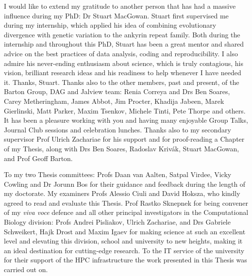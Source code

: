 I would like to extend my gratitude to another person that has had a massive influence during my PhD: Dr Stuart MacGowan. Stuart first supervised me during my internship, which applied his idea of combining evolutionary divergence with genetic variation to the ankyrin repeat family. Both during the internship and throughout this PhD, Stuart has been a great mentor and shared advice on the best practices of data analysis, coding and reproducibility. I also admire his never-ending enthusiasm about science, which is truly contagious, his vision, brilliant research ideas and his readiness to help whenever I have needed it. Thanks, Stuart. Thanks also to the other members, past and present, of the Barton Group, DAG and Jalview team: Renia Correya and Drs Ben Soares, Carey Metheringham, James Abbot, Jim Procter, Khadija Jabeen, Marek Gierlinski, Matt Parker, Maxim Tsenkov, Michele Tinti, Pete Thorpe and others. It has been a pleasure working with you and having many enjoyable Group Talks, Journal Club sessions and celebration lunches. Thanks also to my secondary supervisor Prof Ulrich Zachariae for his support and for proof-reading a Chapter of my Thesis, along with Drs Ben Soares, Radoslav Krivák, Stuart MacGowan, and Prof Geoff Barton.

To my two Thesis committees: Profs Daan van Aalten, Satpal Virdee, Vicky Cowling and Dr Jorunn Bos for their guidance and feedback during the length of my doctorate. My examiners Profs Alessio Ciuli and David Hoksza, who kindly agreed to read and evaluate this Thesis. Prof Rastko Sknepnek for being convener of my \textit{viva voce} defence and all other principal investigators in the Computational Biology division: Profs Andrei Pisliakov, Ulrich Zachariae, and Drs Gabriele Schweikert, Hajk Drost and Maxim Igaev for making science at such an excellent level and elevating this division, school and university to new heights, making it an ideal destination for cutting-edge research. To the IT service of the university for their support of the HPC infrastructure the work presented in this Thesis was carried out on.

